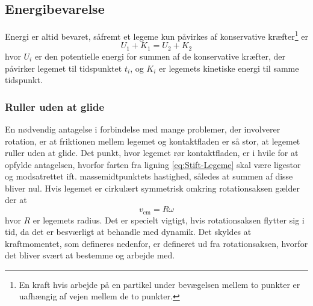 \subsection{Energibevarelse}
Energi er altid bevaret, såfremt et legeme kun påvirkes af konservative kræfter\footnote{En kraft hvis arbejde på en partikel under bevægelsen mellem to punkter er uafhængig af vejen mellem de to punkter.} er
\begin{equation} \label{eq:Energi}
    U_1 + K_1 = U_2 + K_2
\end{equation}
hvor $U_i$ er den potentielle energi for summen af de konservative kræfter, der påvirker legemet til tidspunktet $t_i$, og $K_i$ er legemets kinetiske energi til samme tidspunkt.

\subsubsection{Ruller uden at glide}
En nødvendig antagelse i forbindelse med mange problemer, der involverer rotation, er at friktionen mellem legemet og kontaktfladen er så stor, at legemet ruller uden at glide. Det punkt, hvor legemet rør kontaktfladen, er i hvile for at opfylde antagelsen, hvorfor farten fra ligning \ref{eq:Stift-Legeme} skal være ligestor og modsatrettet ift. massemidtpunktets hastighed, således at summen af disse bliver nul. Hvis legemet er cirkulært symmetrisk omkring rotationsaksen gælder der at
\begin{equation} \label{eq:RollingWithoutSlipping}
    v_\text{cm} = R\omega
\end{equation}
hvor $R$ er legemets radius. Det er specielt vigtigt, hvis rotationsaksen flytter sig i tid, da det er besværligt at behandle med dynamik. Det skyldes at kraftmomentet, som defineres nedenfor, er defineret ud fra rotationsaksen, hvorfor det bliver svært at bestemme og arbejde med. 

